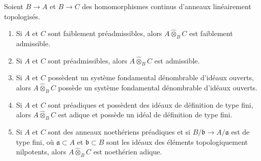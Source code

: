 \begin{lemma}
\label{lemma-completed-tensor-product}
Soient $B \to A$ et $B \to C$ des homomorphismes continus d'anneaux
linéairement topologisés.
\begin{enumerate}
\item Si $A$ et $C$ sont faiblement préadmissibles, alors
$A \widehat{\otimes}_B C$ est faiblement admissible.
\item Si $A$ et $C$ sont préadmissibles, alors
$A \widehat{\otimes}_B C$ est admissible.
\item Si $A$ et $C$ possèdent un système fondamental dénombrable d'idéaux
ouverts, alors $A \widehat{\otimes}_B C$ possède un système fondamental dénombrable
d'idéaux ouverts.
\item Si $A$ et $C$ sont préadiques et possèdent des idéaux de définition
de type fini, alors $A \widehat{\otimes}_B C$ est adique et possède
un idéal de définition de type fini.
\item Si $A$ et $C$ sont des anneaux noethériens préadiques et si
$B/\mathfrak b \to A/\mathfrak a$ est de type fini,
où $\mathfrak a \subset A$ et $\mathfrak b \subset B$
sont les idéaux des éléments topologiquement nilpotents, alors
$A \widehat{\otimes}_B C$ est noethérien adique.
\end{enumerate}
\end{lemma}

